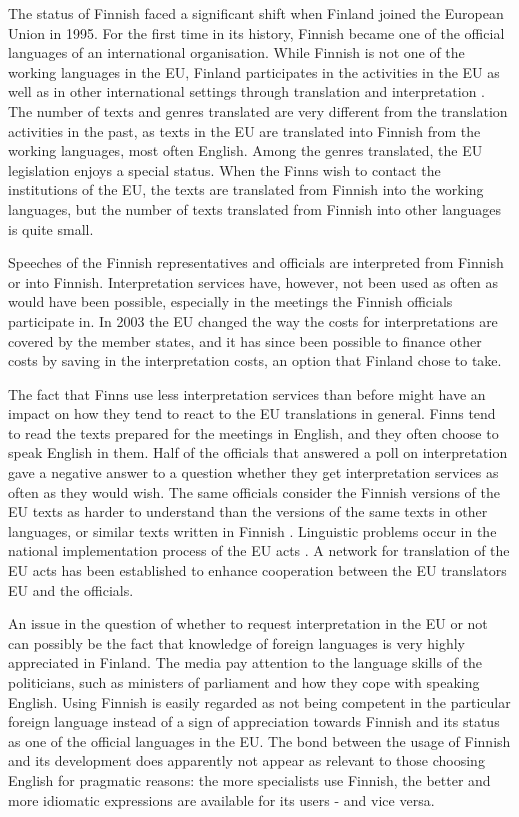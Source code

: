\documentclass[]{../../metanetpaper}
\begin{document}
\begin{Parallel}[c]{70mm}{70mm}
{The status of Finnish faced a significant shift when Finland joined
the European Union in 1995. For the first time in its history, Finnish
became one of the official languages of an international
organisation. While Finnish is not one of the working languages in the
EU, Finland participates in the activities in the EU as well as in
other international settings through translation and
interpretation \cite{Tulevaisuus2009}. The number of texts and genres
translated are very different from the translation activities in the
past, as texts in the EU are translated into Finnish from the working
languages, most often English.  Among the genres translated, the EU
legislation enjoys a special status. When the Finns wish to contact
the institutions of the EU, the texts are translated from Finnish into
the working languages, but the number of texts translated from Finnish
into other languages is quite small.

Speeches of the Finnish representatives and officials are interpreted
from Finnish or into Finnish. Interpretation services have, however,
not been used as often as would have been possible, especially in the
meetings the Finnish officials participate in. In 2003 the EU changed
the way the costs for interpretations are covered by the member
states, and it has since been possible to finance other costs by
saving in the interpretation costs, an option that Finland chose to
take.

The fact that Finns use less interpretation services than before might
have an impact on how they tend to react to the EU translations in
general. Finns tend to read the texts prepared for the meetings in
English, and they often choose to speak English in them. Half of the
officials that answered a poll on interpretation gave a negative
answer to a question whether they get interpretation services as often
as they would wish. The same officials consider the Finnish versions
of the EU texts as harder to understand than the versions of the same
texts in other languages, or similar texts written in Finnish
\cite{Piehl2008}. Linguistic problems occur in the national
implementation process of the EU acts \cite{OECD2010-en}. A network
for translation of the EU acts has been established to enhance
cooperation between the EU translators EU and the officials.

An issue in the question of whether to request interpretation in the
EU or not can possibly be the fact that knowledge of foreign languages
is very highly appreciated in Finland. The media pay attention to the
language skills of the politicians, such as ministers of parliament
and how they cope with speaking English. Using Finnish is easily
regarded as not being competent in the particular foreign language
instead of a sign of appreciation towards Finnish and its status as
one of the official languages in the EU. The bond between the usage of
Finnish and its development does apparently not appear as relevant to
those choosing English for pragmatic reasons: the more specialists use
Finnish, the better and more idiomatic expressions are available for
its users - and vice versa.

}
\end{Parallel}
\end{document}
